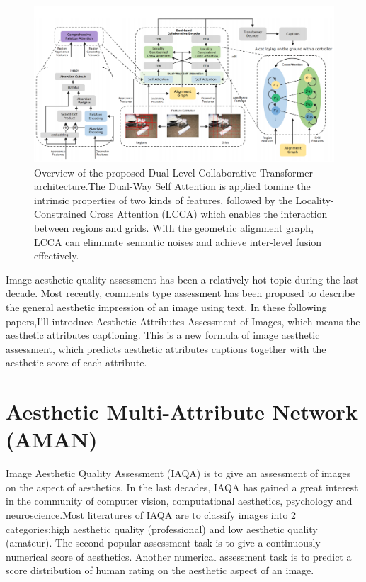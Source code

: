 \documentclass[xelatex,a4j,10pt,twocolumn]{article}
\begin{document}
\begin{figure}[t]
	\centering
    \includegraphics[width=1\textwidth]{8.png}    
 	\caption{Overview of the proposed Dual-Level Collaborative Transformer architecture.The Dual-Way Self Attention is applied tomine the intrinsic properties of two kinds of features, followed by the Locality-Constrained Cross Attention (LCCA) which enables the interaction between regions and grids. With the geometric alignment graph, LCCA can eliminate semantic noises
and achieve inter-level fusion effectively.}
 	\label{fig:8}
\end{figure}



Image aesthetic quality assessment has been a relatively hot topic during the last decade. Most recently, comments type assessment has been proposed to describe the general aesthetic impression of an image using text. In these following papers,I'll introduce Aesthetic Attributes Assessment of Images, which means the aesthetic attributes captioning. This is a new formula of image aesthetic assessment, which predicts aesthetic attributes captions together with the aesthetic score of each attribute.

\section{Aesthetic Multi-Attribute Network (AMAN)}



Image Aesthetic Quality Assessment (IAQA) \cite{6AMAN,13}is to give an assessment of images on the aspect of aesthetics. In the last decades, IAQA has gained a great interest in the community of computer vision,
computational aesthetics, psychology and neuroscience.Most literatures of IAQA are to classify images into 2 categories:high aesthetic quality (professional) and low aesthetic quality (amateur). The second popular assessment task is to give a continuously numerical score of aesthetics. Another numerical assessment task is to predict a score distribution of human rating on the aesthetic aspect of an image.
\end{document}
